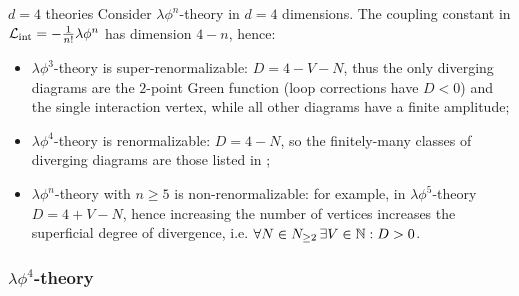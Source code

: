 \begin{example}{$ d = 4 $ theories}{}
  Consider $ \lambda \phi^n $-theory in $ d = 4 $ dimensions. The coupling constant in $ \mathcal{L}_\text{int} = - \frac{1}{n!} \lambda \phi^n $ has dimension $ 4 - n $, hence:
  \begin{itemize}
    \item $ \lambda \phi^3 $-theory is super-renormalizable: $ D = 4 - V - N $, thus the only diverging diagrams are the $ 2 $-point Green function (loop corrections have $ D < 0 $) and the single interaction vertex, while all other diagrams have a finite amplitude;
    \item $ \lambda \phi^4 $-theory is renormalizable: $ D = 4 - N $, so the finitely-many classes of diverging diagrams are those listed in ;
    \item $ \lambda \phi^n $-theory with $ n \ge 5 $ is non-renormalizable: for example, in $ \lambda \phi^5 $-theory $ D = 4 + V - N $, hence increasing the number of vertices increases the superficial degree of divergence, i.e. $ \forall N \in N_{\ge 2} \, \exists V \in \mathbb{N} : D > 0 $.
  \end{itemize}
\end{example}

\subsubsection{\texorpdfstring{$ \lambda \phi^4 $}{λφ4}-theory}










